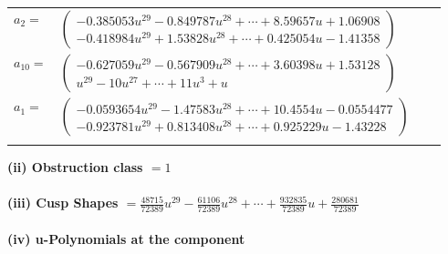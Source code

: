 \documentclass[1p]{elsarticle_modified}
\theoremstyle{definition}
\begin{document}
\begin{tabular}{m{7pt} m{180pt} m{7pt} m{180pt} }
\flushright $a_{2}=$&$\begin{pmatrix}-0.385053 u^{29}-0.849787 u^{28}+\cdots+8.59657 u+1.06908\\-0.418984 u^{29}+1.53828 u^{28}+\cdots+0.425054 u-1.41358\end{pmatrix}$ \\
\flushright $a_{10}=$&$\begin{pmatrix}-0.627059 u^{29}-0.567909 u^{28}+\cdots+3.60398 u+1.53128\\u^{29}-10 u^{27}+\cdots+11 u^3+u\end{pmatrix}$ \\
\flushright $a_{1}=$&$\begin{pmatrix}-0.0593654 u^{29}-1.47583 u^{28}+\cdots+10.4554 u-0.0554477\\-0.923781 u^{29}+0.813408 u^{28}+\cdots+0.925229 u-1.43228\end{pmatrix}$\\&\end{tabular}
\flushleft \textbf{(ii) Obstruction class $= 1$}\\~\\
\flushleft \textbf{(iii) Cusp Shapes $= \frac{48715}{72389} u^{29}-\frac{61106}{72389} u^{28}+\cdots+\frac{932835}{72389} u+\frac{280681}{72389}$}\\~\\
\newpage\renewcommand{\arraystretch}{1}
\flushleft \textbf{(iv) u-Polynomials at the component}\newline \\
\end{document}
